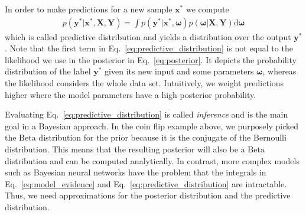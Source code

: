 \documentclass[runningheads]{llncs}
\begin{document}
In order to make predictions for a new sample $\mathbf{x}^*$ we compute
\begin{align}
    p(\mathbf{y}^*|\mathbf{x}^*, \mathbf{X}, \mathbf{Y}) = \int p\left(\mathbf{y}^* | \mathbf{x}^*, \boldsymbol{\omega} \right) p\left(\boldsymbol{\omega} | \mathbf{X}, \mathbf{Y} \right) \text{d}\boldsymbol{\omega}\label{eq:predictive_distribution}
\end{align}
which is called predictive distribution and yields a distribution over the output $\mathbf{y}^*$.
Note that the first term in Eq.~\ref{eq:predictive_distribution} is not equal to the likelihood we use in the posterior in Eq.~\ref{eq:posterior}.
It depicts the probability distribution of the label $\mathbf{y}^*$ given its new input and some parameters $\boldsymbol{\omega}$, whereas the likelihood considers the whole data set.
Intuitively, we weight predictions higher where the model parameters have a high posterior probability.

Evaluating Eq.~\ref{eq:predictive_distribution} is called \textit{inference} and is the main goal in a Bayesian approach. 
In the coin flip example above, we purposely picked the $\mathrm{Beta}$ distribution for the prior because it is the conjugate of the Bernoulli distribution.
This means that the resulting posterior will also be a $\mathrm{Beta}$ distribution and can be computed analytically.
In contrast, more complex models such as Bayesian neural networks have the problem that the integrals in Eq.~\ref{eq:model_evidence} and Eq.~\ref{eq:predictive_distribution} are intractable.
Thus, we need approximations for the posterior distribution and the predictive distribution.

\end{document}
